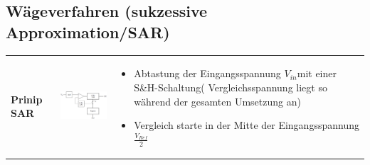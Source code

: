 \subsection{Wägeverfahren (sukzessive Approximation/SAR) }
\begin{longtable}{|>{\bfseries}p{4cm}|p{6cm}|p{8cm}|}
  \hline
    Prinip SAR &
    \includegraphics[width=6cm, valign=t]{images/waegeverfahren} &
    \begin{itemize}
      \item Abtastung der Eingangsspannung $V_{in}$mit einer
          S\&H-Schaltung( Vergleichsspannung liegt so während der gesamten
        Umsetzung an)
      \item Vergleich starte in der Mitte der Eingangsspannung $\frac{V_{Ref}}{2}$
    \end{itemize} \\
    

\end{longtable}
